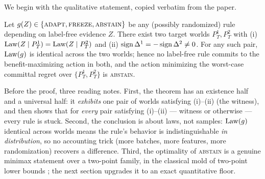 We begin with the qualitative statement, copied verbatim from the paper.

\begin{theorem}\label{thm:imp}
Let $g(Z)\in\{\textsc{adapt},\textsc{freeze},\textsc{abstain}\}$ be any
(possibly randomized) rule depending on label-free evidence $Z$. There exist
two target worlds $P_T^1,P_T^2$ with
\textup{(i)} $\mathrm{Law}(Z\mid P_T^1)=\mathrm{Law}(Z\mid P_T^2)$ and
\textup{(ii)} $\operatorname{sign}\Delta^1=-\operatorname{sign}\Delta^2\neq 0$.
For any such pair, $\mathrm{Law}(g)$ is identical across the two worlds; hence no
label-free rule commits to the benefit-maximizing action in both, and the
action minimizing the worst-case committal regret over $\{P_T^1,P_T^2\}$ is
\textsc{abstain}.
\end{theorem}

Before the proof, three reading notes. First, the theorem has an
existence half and a universal half: it \emph{exhibits} one pair of worlds
satisfying (i)--(ii) (the witness), and then shows that for \emph{every}
pair satisfying (i)--(ii) --- witness or otherwise --- every rule is stuck.
Second, the conclusion is about laws, not samples: $\mathrm{Law}(g)$ identical
across worlds means the rule's behavior is indistinguishable \emph{in
distribution}, so no accounting trick (more batches, more features, more
randomization) recovers a difference. Third, the optimality of
\textsc{abstain} is a genuine minimax statement over a two-point family,
in the classical mold of two-point lower bounds
\cite{lecam1973convergence, tsybakov2009introduction}; the next section
upgrades it to an exact quantitative floor.

